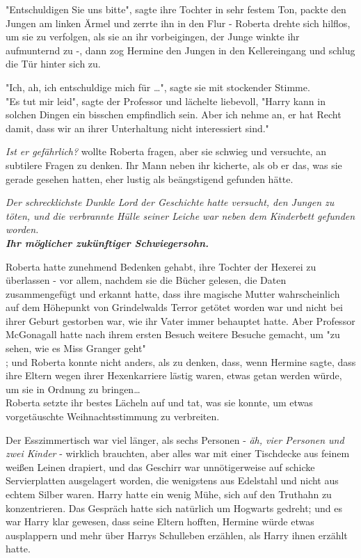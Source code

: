 {"Entschuldigen Sie uns bitte", sagte ihre Tochter in sehr festem Ton, packte den Jungen am linken Ärmel und zerrte ihn in den Flur - Roberta drehte sich hilflos, um sie zu verfolgen, als sie an ihr vorbeigingen, der Junge winkte ihr aufmunternd zu -, dann zog Hermine den Jungen in den Kellereingang und schlug die Tür hinter sich zu.

"Ich, ah, ich entschuldige mich für …", sagte sie mit stockender Stimme.\\ "Es tut mir leid", sagte der Professor und lächelte liebevoll, "Harry kann in solchen Dingen ein bisschen empfindlich sein. Aber ich nehme an, er hat Recht damit, dass wir an ihrer Unterhaltung nicht interessiert sind."

\emph{Ist er gefährlich?} wollte Roberta fragen, aber sie schwieg und versuchte, an subtilere Fragen zu denken. Ihr Mann neben ihr kicherte, als ob er das, was sie gerade gesehen hatten, eher lustig als beängstigend gefunden hätte.

\emph{Der schrecklichste Dunkle Lord der Geschichte hatte versucht, den Jungen zu töten, und die verbrannte Hülle seiner Leiche war neben dem Kinderbett gefunden worden.}\\ \textbf{\emph{Ihr möglicher zukünftiger Schwiegersohn.}}

Roberta hatte zunehmend Bedenken gehabt, ihre Tochter der Hexerei zu überlassen - vor allem, nachdem sie die Bücher gelesen, die Daten zusammengefügt und erkannt hatte, dass ihre magische Mutter wahrscheinlich auf dem Höhepunkt von Grindelwalds Terror getötet worden war und nicht bei ihrer Geburt gestorben war, wie ihr Vater immer behauptet hatte. Aber Professor McGonagall hatte nach ihrem ersten Besuch weitere Besuche gemacht, um "zu sehen, wie es Miss Granger geht"\\ ; und Roberta konnte nicht anders, als zu denken, dass, wenn Hermine sagte, dass ihre Eltern wegen ihrer Hexenkarriere lästig waren, etwas getan werden würde, um sie in Ordnung zu bringen…\\ Roberta setzte ihr bestes Lächeln auf und tat, was sie konnte, um etwas vorgetäuschte Weihnachtsstimmung zu verbreiten.

Der Esszimmertisch war viel länger, als sechs Personen - \emph{äh, vier Personen und zwei Kinder} - wirklich brauchten, aber alles war mit einer Tischdecke aus feinem weißen Leinen drapiert, und das Geschirr war unnötigerweise auf schicke Servierplatten ausgelagert worden, die wenigstens aus Edelstahl und nicht aus echtem Silber waren. Harry hatte ein wenig Mühe, sich auf den Truthahn zu konzentrieren. Das Gespräch hatte sich natürlich um Hogwarts gedreht; und es war Harry klar gewesen, dass seine Eltern hofften, Hermine würde etwas ausplappern und mehr über Harrys Schulleben erzählen, als Harry ihnen erzählt hatte.

}
